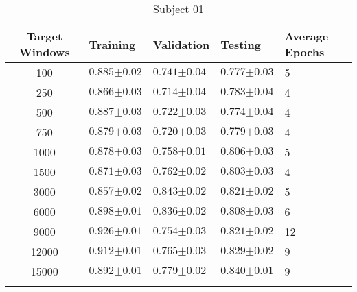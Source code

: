 \begin{table}[H]
    \centering
    \caption[Classification accuracy for a 32 unit  model with the dense layer retrained with increasing amount of target data]{Classification accuracy for a 32 unit \acrshort{lstm} model with the dense layer retrained  with increasing amount of target data. The table shows the classification accuracy for the target user training, validation and testing $\pm\sigma (n=25)$. A value of one represents 100\% correct classification.}
    \label{tab:classifcation_performance_frozen-lstm-layer}
    \begin{subtable}{\textwidth}
    \caption{Subject 01}
    \begin{tabularx}{\textwidth}{cYYYY}
        Target Windows & Training & Validation & Testing & Average Epochs \\
         & $0.885{\scriptscriptstyle\pm0.02}$ & $0.741{\scriptscriptstyle\pm0.04}$ & $0.777{\scriptscriptstyle\pm0.03}$ & 5 \\
250 & $0.866{\scriptscriptstyle\pm0.03}$ & $0.714{\scriptscriptstyle\pm0.04}$ & $0.783{\scriptscriptstyle\pm0.04}$ & 4 \\
500 & $0.887{\scriptscriptstyle\pm0.03}$ & $0.722{\scriptscriptstyle\pm0.03}$ & $0.774{\scriptscriptstyle\pm0.04}$ & 4 \\
750 & $0.879{\scriptscriptstyle\pm0.03}$ & $0.720{\scriptscriptstyle\pm0.03}$ & $0.779{\scriptscriptstyle\pm0.03}$ & 4 \\
1000 & $0.878{\scriptscriptstyle\pm0.03}$ & $0.758{\scriptscriptstyle\pm0.01}$ & $0.806{\scriptscriptstyle\pm0.03}$ & 5 \\
1500 & $0.871{\scriptscriptstyle\pm0.03}$ & $0.762{\scriptscriptstyle\pm0.02}$ & $0.803{\scriptscriptstyle\pm0.03}$ & 4 \\
3000 & $0.857{\scriptscriptstyle\pm0.02}$ & $0.843{\scriptscriptstyle\pm0.02}$ & $0.821{\scriptscriptstyle\pm0.02}$ & 5 \\
6000 & $0.898{\scriptscriptstyle\pm0.01}$ & $0.836{\scriptscriptstyle\pm0.02}$ & $0.808{\scriptscriptstyle\pm0.03}$ & 6 \\
9000 & $0.926{\scriptscriptstyle\pm0.01}$ & $0.754{\scriptscriptstyle\pm0.03}$ & $0.821{\scriptscriptstyle\pm0.02}$ & 12 \\
12000 & $0.912{\scriptscriptstyle\pm0.01}$ & $0.765{\scriptscriptstyle\pm0.03}$ & $0.829{\scriptscriptstyle\pm0.02}$ & 9 \\
15000 & $0.892{\scriptscriptstyle\pm0.01}$ & $0.779{\scriptscriptstyle\pm0.02}$ & $0.840{\scriptscriptstyle\pm0.01}$ & 9 \\
          \\
    \end{tabularx}
    \end{subtable}
\end{table}
